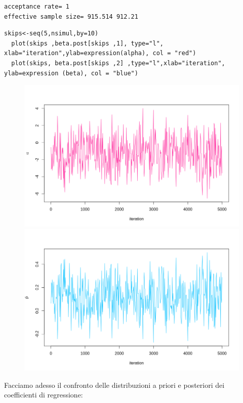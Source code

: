 {\color{red}
\begin{verbatim}
acceptance rate= 1 
effective sample size= 915.514 912.21 
\end{verbatim}
}

\begin{lstlisting}[style=R]
  skips<-seq(5,nsimul,by=10)
  plot(skips ,beta.post[skips ,1], type="l", xlab="iteration",ylab=expression(alpha), col = "red")
  plot(skips, beta.post[skips ,2] ,type="l",xlab="iteration", ylab=expression (beta), col = "blue")
\end{lstlisting}
  
\begin{figure}[htbp]
  \label{fig:grafici}
  \centering
  \includegraphics[width=0.8\linewidth]{img/esercizio10-2-1}%
  \qquad\qquad
  \includegraphics[width=0.8\linewidth]{img/esercizio10-2-2}
\end{figure}

Facciamo adesso il confronto delle distribuzioni a priori e posteriori dei coeffi\-cienti di regressione:

